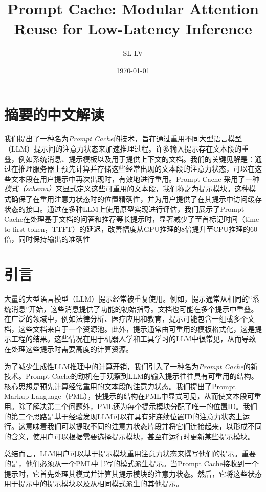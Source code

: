 \documentclass[twocolumn, 10pt]{article} %
\theoremstyle{remark}
\begin{document}
\title{Prompt Cache: Modular Attention Reuse for Low-Latency Inference}
\author{SL LV}
\date{\today}
\maketitle

\section{摘要的中文解读}

我们提出了一种名为\textit{Prompt Cache}的技术，旨在通过重用不同大型语言模型（LLM）提示间的注意力状态来加速推理过程。许多输入提示存在文本段的重叠，例如系统消息、提示模板以及用于提供上下文的文档。我们的关键见解是：通过在推理服务器上预先计算并存储这些经常出现的文本段的注意力状态，可以在这些文本段在用户提示中再次出现时，有效地进行重用。Prompt Cache 采用了一种\textit{模式（schema）}来显式定义这些可重用的文本段，我们称之为提示模块。这种模式确保了在重用注意力状态时的位置精确性，并为用户提供了在其提示中访问缓存状态的接口。通过在多种LLM上使用原型实现进行评估，我们展示了Prompt Cache在处理基于文档的问答和推荐等长提示时，显著减少了至首标记时间（time-to-first-token，TTFT）的延迟，改善幅度从GPU推理的8倍提升至CPU推理的60倍，同时保持输出的准确性


\section{引言}

大量的大型语言模型（LLM）提示经常被重复使用。例如，提示通常从相同的“系统消息”开始，这些消息提供了功能的初始指导。文档也可能在多个提示中重叠。在广泛的领域中，例如法律分析、医疗应用和教育，提示可能包含一组或多个文档，这些文档来自于一个资源池。此外，提示通常由可重用的模板格式化，这是提示工程的结果。这些情况在用于机器人学和工具学习的LLM中很常见，从而导致在处理这些提示时需要高度的计算资源。

为了减少生成性LLM推理中的计算开销，我们引入了一种名为\textit{Prompt Cache}的新技术。Prompt Cache的动机在于观察到LLM的输入提示往往具有可重用的结构。核心思想是预先计算经常重用的文本段的注意力状态。我们提出了Prompt Markup Language（PML），使提示的结构在PML中显式可见，从而使文本段可重用。除了解决第二个问题外，PML还为每个提示模块分配了唯一的位置ID。我们的第二个思路是基于经验发现LLM可以在具有非连续位置ID的注意力状态上运行。这意味着我们可以提取不同的注意力状态片段并将它们连接起来，以形成不同的含义，使用户可以根据需要选择提示模块，甚至在运行时更新某些提示模块。

总结而言，LLM用户可以基于提示模块重用注意力状态来撰写他们的提示。重要的是，他们必须从一个PML中书写的模式派生提示。当Prompt Cache接收到一个提示时，它首先处理其模式并计算其提示模块的注意力状态。然后，它将这些状态用于提示中的提示模块以及从相同模式派生的其他提示。
\end{document}

